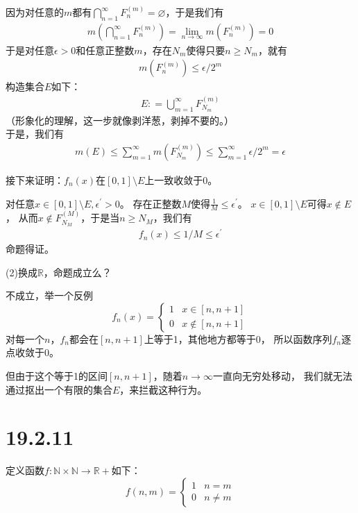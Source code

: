 \documentclass{article}
\begin{document}
因为对任意的$m$都有$\bigcap\limits_{n = 1}^\infty F_n^{(m)} = \varnothing$，于是我们有
\begin{align*}
  m(\bigcap\limits_{n = 1}^\infty F_n^{(m)}) = \lim\limits_{n \to \infty} m(F_n^{(m)}) = 0
\end{align*}
于是对任意$\epsilon > 0$和任意正整数$m$，存在$N_m$使得只要$n \geq N_m$，就有
\begin{align*}
  m(F_n^{(m)}) \leq \epsilon/2^m
\end{align*}
构造集合$E$如下：
\begin{align*}
  E : = \bigcup\limits_{m = 1}^\infty F_{N_m}^{(m)}
\end{align*}
（形象化的理解，这一步就像剥洋葱，剥掉不要的。）\\
于是，我们有
\begin{align*}
  m(E) \leq \sum\limits_{m=1}^\infty m(F_{N_m}^{(m)}) \leq \sum\limits_{m = 1}^\infty \epsilon/2^m = \epsilon
\end{align*}

接下来证明：$f_n(x)$在$[0, 1] \setminus E$上一致收敛于$0$。

对任意$x \in [0, 1] \setminus E, \epsilon^\prime > 0$。
存在正整数$M$使得$\frac{1}{M} \leq \epsilon^\prime$。
$x \in [0, 1] \setminus E$可得$x \notin E$，
从而$x \notin F_{N_M}^{(M)}$，于是当$n \geq N_M$，我们有
\begin{align*}
  f_n(x) \leq 1/M \leq \epsilon^\prime
\end{align*}
命题得证。

(2)换成$\mathbb{R}$，命题成立么？

不成立，举一个反例
\begin{equation*}
  f_n(x) = \begin{cases}
    1 & x \in [n, n+1]    \\
    0 & x \notin [n, n+1]
  \end{cases}
\end{equation*}
对每一个$n$，$f_n$都会在$[n, n+1]$上等于1，其他地方都等于$0$，
所以函数序列$f_n$逐点收敛于$0$。

但由于这个等于1的区间$[n, n+1]$，随着$n \to \infty$一直向无穷处移动，
我们就无法通过抠出一个有限的集合$E$，来拦截这种行为。

\section*{19.2.11}
定义函数$f: \mathbb{N} \times \mathbb{N} \to \mathbb{R}+$如下：
\begin{equation*}
  f(n, m) = \begin{cases}
    1 & n = m    \\
    0 & n \neq m
  \end{cases}
\end{equation*}
\end{document}
